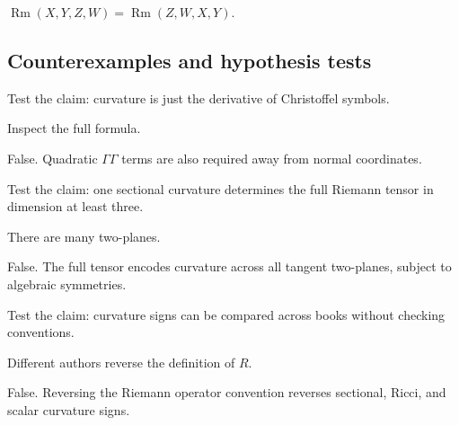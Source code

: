 \begin{solution}
\(\operatorname{Rm}(X,Y,Z,W)=\operatorname{Rm}(Z,W,X,Y)\).
\end{solution}

\subsection*{Counterexamples and hypothesis tests}

\begin{exercise}\label{exr:vii26-ped-10}
Test the claim: curvature is just the derivative of Christoffel symbols.
\end{exercise}

\begin{hint}
Inspect the full formula.
\end{hint}

\begin{solution}
False.  Quadratic \(\Gamma\Gamma\) terms are also required away from normal coordinates.
\end{solution}

\begin{exercise}\label{exr:vii26-ped-11}
Test the claim: one sectional curvature determines the full Riemann tensor in dimension at least three.
\end{exercise}

\begin{hint}
There are many two-planes.
\end{hint}

\begin{solution}
False.  The full tensor encodes curvature across all tangent two-planes, subject to algebraic symmetries.
\end{solution}

\begin{exercise}\label{exr:vii26-ped-12}
Test the claim: curvature signs can be compared across books without checking conventions.
\end{exercise}

\begin{hint}
Different authors reverse the definition of \(R\).
\end{hint}

\begin{solution}
False.  Reversing the Riemann operator convention reverses sectional, Ricci, and scalar curvature signs.
\end{solution}

